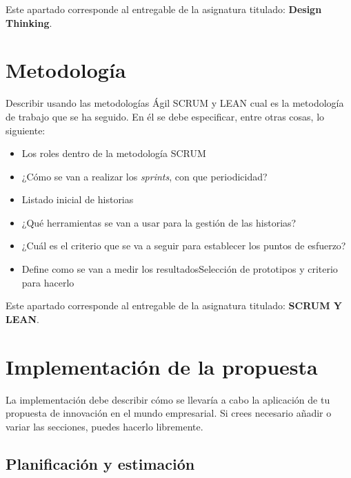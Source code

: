 \documentclass[12pt,a4paper]{articuloAPA}
\begin{document}
\begin{quotebox}
  Este apartado corresponde al entregable de la asignatura titulado: \textbf{Design Thinking}.
\end{quotebox}


\section{Metodología}

Describir usando las metodologías Ágil SCRUM y LEAN cual es la metodología de trabajo que se ha seguido. En él se debe especificar, entre otras cosas, lo siguiente:

\begin{itemize}
  \item Los roles dentro de la metodología SCRUM
  \item ¿Cómo se van a realizar los \textit{sprints}, con que periodicidad?
  \item Listado inicial de historias
  \item ¿Qué herramientas se van a usar para la gestión de las historias?
  \item ¿Cuál es el criterio que se va a seguir para establecer los puntos de esfuerzo?
  \item Define como se van a medir los resultadosSelección de prototipos y criterio para hacerlo  
\end{itemize}

\begin{quotebox}
  Este apartado corresponde al entregable de la asignatura titulado: \textbf{SCRUM Y LEAN}.
\end{quotebox}

\section{Implementación de la propuesta}

La implementación debe describir cómo se llevaría a cabo la aplicación de tu propuesta de innovación en el mundo empresarial. Si crees necesario añadir o variar las secciones, puedes hacerlo libremente.

\subsection{Planificación y estimación}
\end{document}
